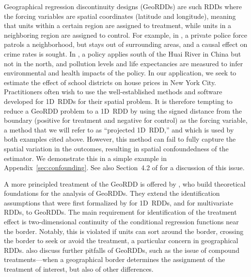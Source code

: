 \documentclass[letter,12pt]{article}
\begin{document}
Geographical regression discontinuity designs (GeoRDDs) are such RDDs where the forcing variables are spatial coordinates (latitude and longitude),
meaning that units within a certain region are assigned to treatment, while units in a neighboring region are assigned to control.
For example, in \cite{macdonald2015effect}, a private police force patrols a neighborhood, but stays out of surrounding areas, and a causal effect on crime rates is sought.
In \cite{chen2013evidence}, a policy applies south of the Huai River in China but not in the north, and pollution levels and life expectancies are measured to infer environmental and health impacts of the policy.
In our application, we seek to estimate the effect of school districts on house prices in New York City.
Practitioners often wish to use the well-established methods and software developed for 1D~RDDs for their spatial problem.
It is therefore tempting to reduce a GeoRDD problem to a 1D~RDD by using the signed distance from the boundary (positive for treatment and negative for control) as the forcing variable, a method that we will refer to as ``projected 1D~RDD,'' and which is used by both examples cited above.
However, this method can fail to fully capture the spatial variation in the outcomes, resulting in spatial confoundedness of the estimator.
We demonstrate this in a simple example in Appendix~\ref{sec:confounding}.
See also Section~4.2 of \cite{keele_titiunik_2015} for a discussion of this issue.



A more principled treatment of the GeoRDD is offered by \cite{keele_titiunik_2015}, who build theoretical foundations for the analysis of GeoRDDs.
They extend the identification assumptions that were first formalized by \cite{hahn2001identification} for 1D~RDDs, and \cite{imbens2011regression} for multivariate RDDs, to GeoRDDs.
The main requirement for identification of the treatment effect is two-dimensional continuity of the conditional regression functions near the border.
Notably, this is violated if units can sort around the border, crossing the border to seek or avoid the treatment, a particular concern in geographical RDDs.
\cite{keele_titiunik_2015} also discuss further pitfalls of GeoRDDs, such as the issue of compound treatments---when a geographical border determines the assignment of the treatment of interest, but also of other differences.
\end{document}
